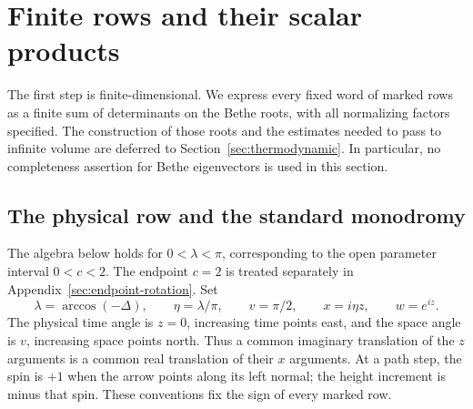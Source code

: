 \section{Finite rows and their scalar products}\label{sec:finite}

The first step is finite-dimensional.  We express every fixed word of
marked rows as a finite sum of determinants on the Bethe roots, with all
normalizing factors specified.  The construction of those roots and the
estimates needed to pass to infinite volume are deferred to
Section~\ref{sec:thermodynamic}.  In particular, no completeness assertion
for Bethe eigenvectors is used in this section.

\subsection{The physical row and the standard monodromy}

The algebra below holds for $0<\lambda<\pi$, corresponding to the
open parameter interval $0<c<2$. The endpoint $c=2$ is treated
separately in Appendix~\ref{sec:endpoint-rotation}. Set
\begin{equation}\label{eq:spectral-coordinates}
 \lambda=\arccos(-\Delta),\qquad \eta=\lambda/\pi,\qquad
 v=\pi/2,\qquad x=i\eta z,\qquad w=e^{iz}.
\end{equation}
The physical time angle is $z=0$, increasing time points east, and the
space angle is $v$, increasing space points north.  Thus a common
imaginary translation of the $z$ arguments is a common real translation
of their $x$ arguments.  At a path step, the spin is $+1$ when the arrow
points along its left normal; the height increment is minus that spin.
These conventions fix the sign of every marked row.


